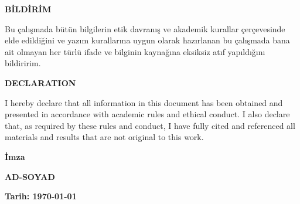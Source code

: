 \begin{center}
\textbf{BİLDİRİM}
\end{center}
\begin{singlespace}%
Bu çalışmada bütün bilgilerin etik davranış ve akademik kurallar çerçevesinde elde edildiğini ve yazım kurallarına uygun olarak hazırlanan bu çalışmada bana ait olmayan her türlü ifade ve bilginin kaynağına eksiksiz atıf yapıldığını bildiririm.
\end{singlespace}
\vspace{2cm}

\begin{center}
\textbf{DECLARATION}
\end{center}
\begin{singlespace}
I hereby declare that all information in this document has been obtained and presented in accordance with academic rules and ethical conduct. I also declare that, as required by these rules and conduct, I have fully cited and referenced all materials and results that are not original to this work.
\end{singlespace}

\vspace{3cm}
\begin{flushright}
\begin{minipage}{5cm}
\begin{center}
\textbf{İmza}

\textbf{AD-SOYAD}

\textbf{Tarih: {\today}}\hfill
\end{center}
\end{minipage}
\end{flushright}
